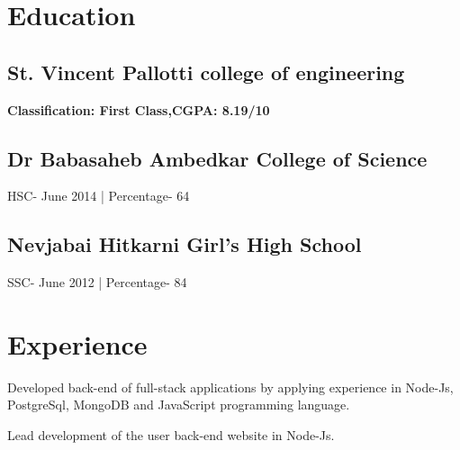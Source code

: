 \documentclass[]{deedy-resume-openfont}
\begin{document}
%
%
\lastupdated

%
%

%
%
\begin{minipage}[t]{0.66\textwidth} 



\section{Education} 
\subsection{St. Vincent Pallotti college of engineering}
\textbf{Classification: First Class,CGPA: 8.19/10} 
\sectionsep 
\subsection{Dr Babasaheb Ambedkar College of Science}
\textbf{}{HSC- June 2014 | Percentage- 64}
\sectionsep 
\subsection{Nevjabai Hitkarni Girl's High School}
\textbf{}{SSC- June 2012 | Percentage- 84 }
\subsection{}

\section{Experience}
\vspace{\topsep} %
\begin{tightemize}
\item Developed back-end of full-stack applications by applying experience in
Node-Js, PostgreSql, MongoDB and JavaScript programming language.
\item Lead development of the user back-end website in Node-Js.
\end{tightemize}
\sectionsep


\end{minipage}
\end{document}

